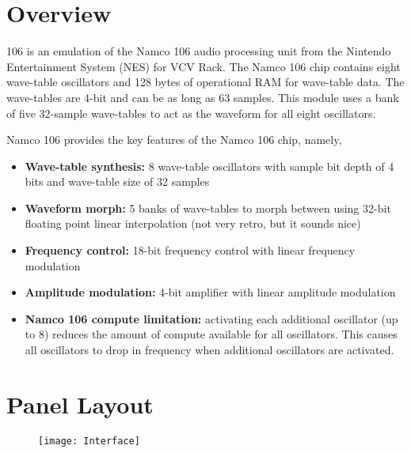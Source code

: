 \documentclass[12pt,letter]{article}
\begin{document}


\section*{Overview}

106 is an emulation of the Namco 106 audio processing unit from the Nintendo Entertainment System (NES) for VCV Rack. The Namco 106 chip contains eight wave-table oscillators and 128 bytes of operational RAM for wave-table data. The wave-tables are 4-bit and can be as long as 63 samples. This module uses a bank of five 32-sample wave-tables to act as the waveform for all eight oscillators.

Namco 106 provides the key features of the Namco 106 chip, namely,
\begin{itemize}
  \item \textbf{Wave-table synthesis:} 8 wave-table oscillators with sample bit depth of 4 bits and wave-table size of 32 samples
  \item \textbf{Waveform morph:} 5 banks of wave-tables to morph between using 32-bit floating point linear interpolation (not very retro, but it sounds nice)
  \item \textbf{Frequency control:} 18-bit frequency control with linear frequency modulation
  \item \textbf{Amplitude modulation:} 4-bit amplifier with linear amplitude modulation
  \item \textbf{Namco 106 compute limitation:} activating each additional oscillator (up to 8) reduces the amount of compute available for all oscillators. This causes all oscillators to drop in frequency when additional oscillators are activated.
\end{itemize}


\clearpage
\section*{Panel Layout}

\begin{figure}[!htp]
\centering
\texttt{[image: Interface]}
\end{figure}
\end{document}
